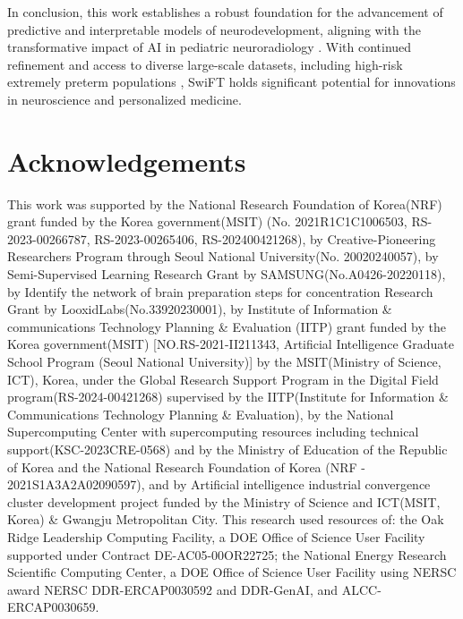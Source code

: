 \documentclass[runningheads,a4paper]{llncs}
\begin{document}
In conclusion, this work establishes a robust foundation for the advancement of predictive and interpretable models of neurodevelopment, aligning with the transformative impact of AI in pediatric neuroradiology \cite{RadiologyAI2024}. With continued refinement and access to diverse large-scale datasets, including high-risk extremely preterm populations \cite{Schmidbauer2024Outcome}, SwiFT holds significant potential for innovations in neuroscience and personalized medicine.


\section*{Acknowledgements}
\label{sec:acknowledgements}
{%
This work was supported by the National Research Foundation of Korea(NRF) grant funded by the Korea government(MSIT) (No. 2021R1C1C1006503, RS-2023-00266787, RS-2023-00265406, RS-202400421268), by Creative-Pioneering Researchers Program through Seoul National University(No. 20020240057), by Semi-Supervised Learning Research Grant by SAMSUNG(No.A0426-20220118), by Identify the network of brain preparation steps for concentration Research Grant by LooxidLabs(No.33920230001), by Institute of Information \& communications Technology Planning \& Evaluation (IITP) grant funded by the Korea government(MSIT) [NO.RS-2021-II211343, Artificial Intelligence Graduate School Program (Seoul National University)] by the MSIT(Ministry of Science, ICT), Korea, under the Global Research Support Program in the Digital Field program(RS-2024-00421268) supervised by the IITP(Institute for Information \& Communications Technology Planning \& Evaluation), by the National Supercomputing Center with supercomputing resources including technical support(KSC-2023CRE-0568) and by the Ministry of Education of the Republic of Korea and the National Research Foundation of Korea (NRF - 2021S1A3A2A02090597), and by Artificial intelligence industrial convergence cluster development project funded by the Ministry of Science and ICT(MSIT, Korea) \& Gwangju Metropolitan City. This research used resources of: the Oak Ridge Leadership Computing Facility, a DOE Office of Science User Facility supported under Contract DE-AC05-00OR22725; the National Energy Research Scientific Computing Center, a DOE Office of Science User Facility using NERSC award NERSC DDR-ERCAP0030592 and DDR-GenAI, and ALCC-ERCAP0030659.
}
\end{document}
